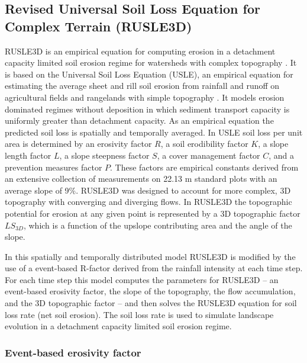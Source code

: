 \documentclass[gmd, manuscript]{copernicus}
\begin{document}
\subsection{Revised Universal Soil Loss Equation for Complex Terrain (RUSLE3D)}
\label{rusle_model}
RUSLE3D
is an empirical equation for computing erosion 
in a detachment capacity limited soil erosion regime
for watersheds with complex topography \citep{Mitasova1996}. 
It is based on 
the Universal Soil Loss Equation (USLE),
an empirical equation for estimating the average
sheet and rill soil erosion from rainfall and runoff
on agricultural fields and rangelands with simple topography 
\citep{Wischmeier1978}. 
It models erosion dominated regimes without deposition
in which sediment transport capacity is 
uniformly greater than detachment capacity.
As an empirical equation the predicted soil loss 
is spatially and temporally averaged. 
In USLE soil loss per unit area is determined by 
an erosivity factor $R$,
a soil erodibility factor $K$, 
a slope length factor $L$,
a slope steepness factor $S$,
a cover management factor $C$,
and a prevention measures factor $P$.
These factors are empirical constants derived 
from an extensive collection of measurements 
on 22.13 \unit{m} standard plots with an average slope of 9$\%$.  
RUSLE3D was designed to account for more complex, 3D topography 
with converging and diverging flows. 
In RUSLE3D the topographic potential for erosion at any given point 
is represented by a 3D topographic factor $LS_{3D}$,
which is a function of the upslope contributing area 
and the angle of the slope. 

In this spatially and temporally distributed model 
RUSLE3D is modified by the use of a 
event-based R-factor derived from the rainfall intensity 
at each time step.
For each time step this model computes the parameters for RUSLE3D -- 
an event-based erosivity factor,
the slope of the topography, the flow accumulation, and
the 3D topographic factor -- and then
solves the RUSLE3D equation for soil loss rate (net soil erosion). 
The soil loss rate is used to simulate landscape evolution 
in a detachment capacity limited soil erosion regime.



\subsubsection{Event-based erosivity factor}
\end{document}
